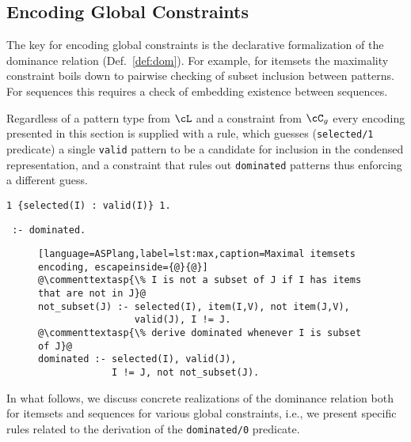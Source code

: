 \subsection{Encoding Global Constraints}

The key for encoding global constraints is the declarative formalization of the dominance relation (Def.~\ref{def:dom}). For example, for itemsets the maximality constraint boils down to pairwise checking of subset inclusion between patterns. For sequences this requires a check of embedding existence between sequences.



 Regardless of a pattern type from $\cL$ %
and a constraint from $\cC_g$ every encoding presented 
in this section is supplied with a rule, which guesses (\texttt{selected/1} predicate) a single \texttt{valid} pattern to be a candidate for inclusion in the condensed representation, and a constraint that rules out \texttt{dominated} patterns thus enforcing a different guess. 


\small{\begin{center}
\texttt{1 \{selected(I) : valid(I)\} 1.}
\end{center}

\begin{center}
\texttt{ :- dominated.}
\end{center}}


 \begin{figure}[t]
\small{
 \begin{lstlisting}[language=ASPlang,label=lst:max,caption=Maximal itemsets encoding, escapeinside={@}{@}]
@\commenttextasp{\% I is not a subset of J if I has items that are not in J}@
not_subset(J) :- selected(I), item(I,V), not item(J,V), 
                 valid(J), I != J.
@\commenttextasp{\% derive dominated whenever I is subset of J}@
dominated :- selected(I), valid(J), 
             I != J, not not_subset(J).
\end{lstlisting}}
 \end{figure}
 \normalsize{In what follows, we discuss concrete realizations of the dominance relation both for itemsets and sequences for various global constraints, i.e., we present specific rules related to the derivation of the \texttt{dominated/0} predicate.
}

